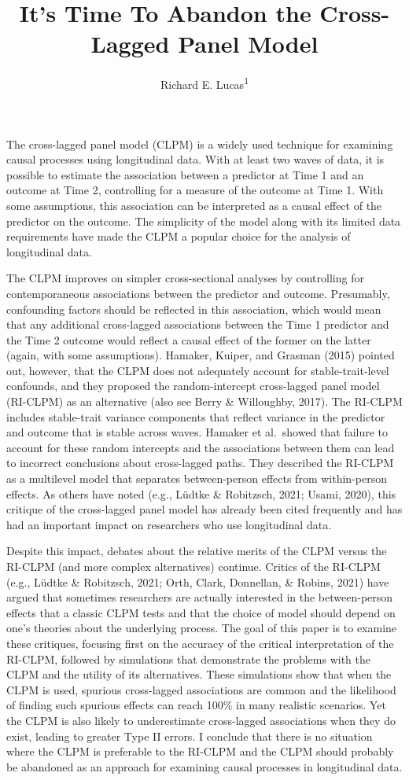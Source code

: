 \documentclass[
  english,
  man,floatsintext]{apa6}
\title{It's Time To Abandon the Cross-Lagged Panel Model}
\author{Richard E. Lucas\textsuperscript{1}}
\date{}
\affiliation{\vspace{0.5cm}\textsuperscript{1} Department of Psychology, Michigan State University}
\begin{document}
\maketitle

The cross-lagged panel model (CLPM) is a widely used technique for examining causal processes using longitudinal data. With at least two waves of data, it is possible to estimate the association between a predictor at Time 1 and an outcome at Time 2, controlling for a measure of the outcome at Time 1. With some assumptions, this association can be interpreted as a causal effect of the predictor on the outcome. The simplicity of the model along with its limited data requirements have made the CLPM a popular choice for the analysis of longitudinal data.

The CLPM improves on simpler cross-sectional analyses by controlling for contemporaneous associations between the predictor and outcome. Presumably, confounding factors should be reflected in this association, which would mean that any additional cross-lagged associations between the Time 1 predictor and the Time 2 outcome would reflect a causal effect of the former on the latter (again, with some assumptions). Hamaker, Kuiper, and Grasman (2015) pointed out, however, that the CLPM does not adequately account for stable-trait-level confounds, and they proposed the random-intercept cross-lagged panel model (RI-CLPM) as an alternative (also see Berry \& Willoughby, 2017). The RI-CLPM includes stable-trait variance components that reflect variance in the predictor and outcome that is stable across waves. Hamaker et al.~showed that failure to account for these random intercepts and the associations between them can lead to incorrect conclusions about cross-lagged paths. They described the RI-CLPM as a multilevel model that separates between-person effects from within-person effects. As others have noted (e.g., Lüdtke \& Robitzsch, 2021; Usami, 2020), this critique of the cross-lagged panel model has already been cited frequently and has had an important impact on researchers who use longitudinal data.

Despite this impact, debates about the relative merits of the CLPM versus the RI-CLPM (and more complex alternatives) continue. Critics of the RI-CLPM (e.g., Lüdtke \& Robitzsch, 2021; Orth, Clark, Donnellan, \& Robins, 2021) have argued that sometimes researchers are actually interested in the between-person effects that a classic CLPM tests and that the choice of model should depend on one's theories about the underlying process. The goal of this paper is to examine these critiques, focusing first on the accuracy of the critical interpretation of the RI-CLPM, followed by simulations that demonstrate the problems with the CLPM and the utility of its alternatives. These simulations show that when the CLPM is used, spurious cross-lagged associations are common and the likelihood of finding such spurious effects can reach 100\% in many realistic scenarios. Yet the CLPM is also likely to underestimate cross-lagged associations when they do exist, leading to greater Type II errors. I conclude that there is no situation where the CLPM is preferable to the RI-CLPM and the CLPM should probably be abandoned as an approach for examining causal processes in longitudinal data.
\end{document}
